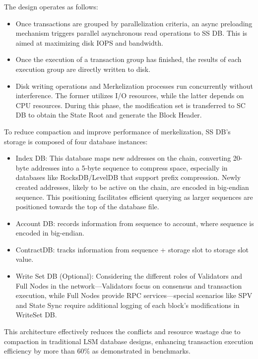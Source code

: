 The design operates as follows:

\begin{itemize}
    \item Once transactions are grouped by parallelization criteria, an async preloading mechanism triggers parallel asynchronous read operations to SS DB. This is aimed at maximizing disk IOPS and bandwidth.
    \item Once the execution of a transaction group has finished, the results of each execution group are directly written to disk.
    \item Disk writing operations and Merkelization processes run concurrently without interference. The former utilizes I/O resources, while the latter depends on CPU resources. During this phase, the modification set is transferred to SC DB to obtain the State Root and generate the Block Header.
\end{itemize}

To reduce compaction and improve performance of merkelization, SS DB's storage is composed of four database instances:

\begin{itemize}
    \item Index DB: This database maps new addresses on the chain, converting 20-byte addresses into a 5-byte sequence to compress space, especially in databases like RocksDB/LevelDB that support prefix compression. Newly created addresses, likely to be active on the chain, are encoded in big-endian sequence. This positioning facilitates efficient querying as larger sequences are positioned towards the top of the database file.
    \item Account DB: records information from sequence to account, where sequence is encoded in big-endian.
    \item ContractDB: tracks information from sequence + storage slot to storage slot value.
    \item Write Set DB (Optional): Considering the different roles of Validators and Full Nodes in the network—Validators focus on consensus and transaction execution, while Full Nodes provide RPC services—special scenarios like SPV and State Sync require additional logging of each block's modifications in WriteSet DB.
\end{itemize}

This architecture effectively reduces the conflicts and resource wastage due to compaction in traditional LSM database designs, enhancing transaction execution efficiency by more than 60\% as demonstrated in benchmarks.

